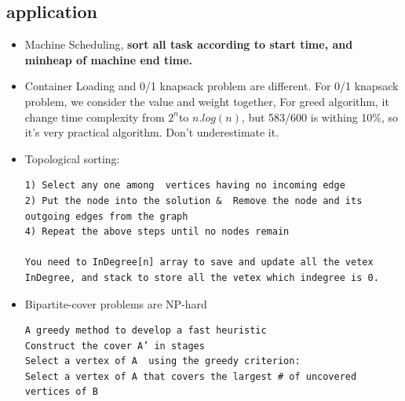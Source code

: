 \documentclass[a4paper,11pt,twoside]{book}
\begin{document}
\subsection{application}
\begin{itemize}
\item  Machine Scheduling, \textbf{sort all task according to start time, and minheap of machine end time. }

\item Container Loading and 0/1 knapsack problem are different. For 0/1 knapsack problem, we consider the value and weight together,  For greed algorithm, it change time complexity from $2^{n}$to $n.log(n)$, but 583/600 is withing 10\%, so it's very practical algorithm.  Don't underestimate it. 

\item Topological sorting: 
\begin{verbatim}
1) Select any one among  vertices having no incoming edge
2) Put the node into the solution &  Remove the node and its outgoing edges from the graph
4) Repeat the above steps until no nodes remain

You need to InDegree[n] array to save and update all the vetex InDegree, and stack to store all the vetex which indegree is 0.  
\end{verbatim}


\item Bipartite-cover problems are NP-hard
\begin{verbatim}
A greedy method to develop a fast heuristic
Construct the cover A’ in stages
Select a vertex of A  using the greedy criterion:
Select a vertex of A that covers the largest # of uncovered vertices of B
\end{verbatim}


\end{itemize}
\end{document}
